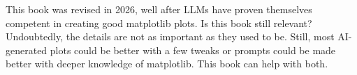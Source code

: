 This book was revised in 2026, well after LLMs have proven themselves competent in creating good matplotlib plots. Is this book still relevant? Undoubtedly, the details are not as important as they used to be. Still, most AI-generated plots could be better with a few tweaks or prompts could be made better with deeper knowledge of matplotlib. This book can help with both.
